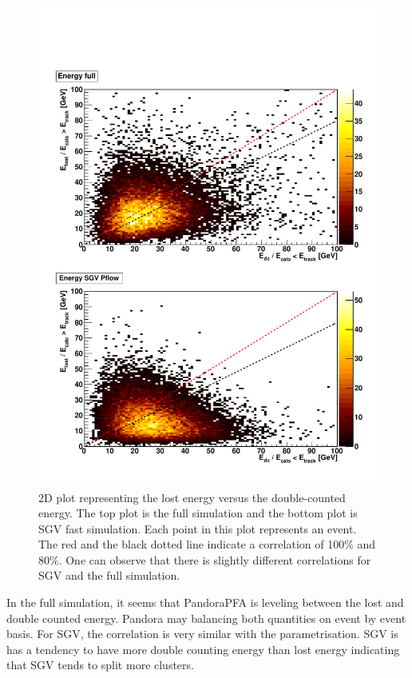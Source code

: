 \begin{figure}[htbp!]
  \centering
  \includegraphics[width=1\linewidth]{Appendixes/fig_SGV/Correlation_nojet.pdf}
  \caption{2D plot representing the lost energy versus the double-counted energy. The top plot is the full simulation and the bottom plot is SGV fast simulation. Each point in this plot represents an event. The red and the black dotted line indicate a correlation of 100\% and 80\%. One can observe that there is slightly different correlations for SGV and the full simulation.}
  \label{fig:cluster_track_level}
\end{figure}

In the full simulation, it seems that PandoraPFA is leveling between the lost and double counted energy. Pandora may balancing both quantities on event by event basis. For SGV, the correlation is very similar with the parametrisation. SGV is has a tendency to have more double counting energy than lost energy indicating that SGV tends to split more clusters.

